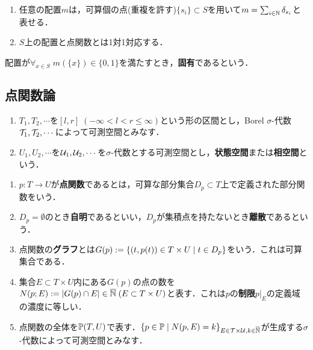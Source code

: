 \documentclass[uplatex,dvipdfmx]{jsreport}
\begin{document}
\begin{lemma}\mbox{}
    \begin{enumerate}
        \item 任意の配置$m$は，可算個の点(重複を許す)$\{s_i\}\subset S$を用いて$m=\sum_{i\in\mathbb{N}}\delta_{s_i}$と表せる．
        \item $S$上の配置と点関数とは1対1対応する．
    \end{enumerate}
\end{lemma}

\begin{definition}
    配置が$\forall_{x\in S}\;m(\{x\})\in\{0,1\}$を満たすとき，\textbf{固有}であるという．
\end{definition}

\subsection{点関数論}

\begin{notation}\mbox{}
    \begin{enumerate}
        \item $T_1,T_2,\cdots$を$[l,r]\;(-\infty<l<r\le\infty)$という形の区間とし，Borel $\sigma$-代数$\mathcal{T}_1,\mathcal{T}_2,\cdots$によって可測空間とみなす．
        \item $U_1,U_2,\cdots$を$\mathcal{U}_1,\mathcal{U}_2,\cdots$を$\sigma$-代数とする可測空間とし，\textbf{状態空間}または\textbf{相空間}という．
    \end{enumerate}
\end{notation}

\begin{definition}\mbox{}
    \begin{enumerate}
        \item $p:T\to U$が\textbf{点関数}であるとは，可算な部分集合$D_p\subset T$上で定義された部分関数をいう．
        \item $D_p=\emptyset$のとき\textbf{自明}であるといい，$D_p$が集積点を持たないとき\textbf{離散}であるという．
        \item 点関数の\textbf{グラフ}とは$G(p):=\left\{(t,p(t))\in T\times U\mid t\in D_p\right\}$をいう．これは可算集合である．
        \item 集合$E\subset T\times U$内にある$G(p)$の点の数を$N(p;E):=\lvert G(p)\cap E\rvert\in\overline{\mathbb{N}}\;(E\subset T\times U)$と表す．これは$p$の\textbf{制限}$p|_E$の定義域の濃度に等しい．
        \item 点関数の全体を$\mathbb{P}(T,U)$で表す．$\{p\in\mathbb{P}\mid N(p,E)=k\}_{E\in\mathcal{T}\times\mathcal{U},k\in\overline{\mathbb{N}}}$が生成する$\sigma$-代数によって可測空間とみなす．
    \end{enumerate}
\end{definition}
\end{document}
